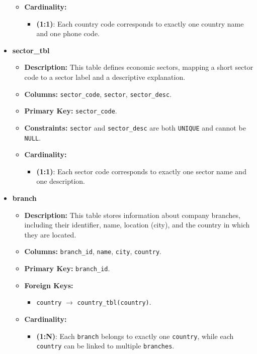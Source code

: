 \documentclass[12pt,a4paper]{article}
\begin{document}
\begin{itemize}
\begin{itemize}
        \item \textbf{Cardinality:}
        \begin{itemize}
             \item \textbf{(1:1)}: Each country code corresponds to exactly one country name and one phone code.
        \end{itemize}
    \end{itemize}

    \item \textbf{sector\_tbl}
    \begin{itemize}
        \item \textbf{Description:} This table defines economic sectors, mapping a short sector code to a sector label and a descriptive explanation.
        \item \textbf{Columns:} \texttt{sector\_code}, \texttt{sector}, \texttt{sector\_desc}.
        \item \textbf{Primary Key:} \texttt{sector\_code}.
        \item \textbf{Constraints:}
             \texttt{sector} and \texttt{sector\_desc} are both \texttt{UNIQUE} and cannot be \texttt{NULL}.
        \item \textbf{Cardinality:}
        \begin{itemize}
             \item \textbf{(1:1)}: Each sector code corresponds to exactly one sector name and one description.
        \end{itemize}
    \end{itemize}

    \item \textbf{branch}
    \begin{itemize}
        \item \textbf{Description:} This table stores information about company branches, including their identifier, name, location (city), and the country in which they are located.
        \item \textbf{Columns:} \texttt{branch\_id}, \texttt{name}, \texttt{city}, \texttt{country}.
        \item \textbf{Primary Key:} \texttt{branch\_id}.
        \item \textbf{Foreign Keys:} 
        \begin{itemize}
            \item \texttt{country} $\to$ \texttt{country\_tbl(country)}.
        \end{itemize}
        \item \textbf{Cardinality:}
        \begin{itemize}
             \item \textbf{(1:N)}: Each \texttt{branch} belongs to exactly one \texttt{country}, while each \texttt{country} can be linked to multiple \texttt{branches}.
        \end{itemize}
    \end{itemize}


\end{itemize}
\end{document}
